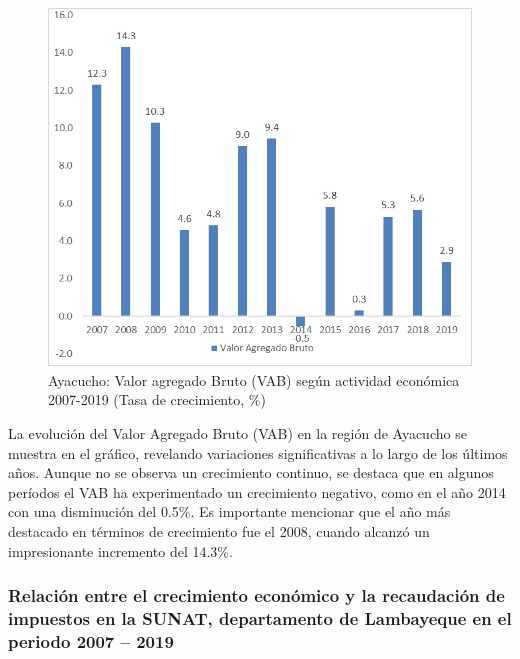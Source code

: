 \documentclass[
  letterpaper,
]{article}
\begin{document}
\begin{figure}

\caption{\label{fig-4}Ayacucho: Valor agregado Bruto (VAB) según
actividad económica 2007-2019 (Tasa de crecimiento, \%)}

{\centering \includegraphics{20230603230848.png}

}

\end{figure}

La evolución del Valor Agregado Bruto (VAB) en la región de Ayacucho se
muestra en el gráfico, revelando variaciones significativas a lo largo
de los últimos años. Aunque no se observa un crecimiento continuo, se
destaca que en algunos períodos el VAB ha experimentado un crecimiento
negativo, como en el año 2014 con una disminución del 0.5\%. Es
importante mencionar que el año más destacado en términos de crecimiento
fue el 2008, cuando alcanzó un impresionante incremento del 14.3\%.

\hypertarget{relaciuxf3n-entre-el-crecimiento-econuxf3mico-y-la-recaudaciuxf3n-de-impuestos-en-la-sunat-departamento-de-lambayeque-en-el-periodo-2007-2019}{%
\subsubsection{Relación entre el crecimiento económico y la recaudación
de impuestos en la SUNAT, departamento de Lambayeque en el periodo 2007
--
2019}\label{relaciuxf3n-entre-el-crecimiento-econuxf3mico-y-la-recaudaciuxf3n-de-impuestos-en-la-sunat-departamento-de-lambayeque-en-el-periodo-2007-2019}}
\end{document}
